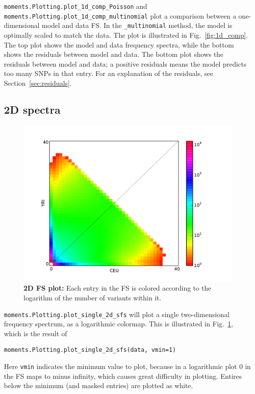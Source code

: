 \documentclass[12pt]{article}
\makeatletter
\newcommand{\py}[1]{\lstinline[breaklines=true,language=Python, showstringspaces=False]@#1@}
\makeatother
\begin{document}
\py{moments.Plotting.plot_1d_comp_Poisson} and \py{moments.Plotting.plot_1d_comp_multinomial} plot a comparison between a one-dimensional model and data FS.
In the \py{_multinomial} method, the model is optimally scaled to match the data.
The plot is illustrated in Fig.~\ref{fig:1d_comp}.
The top plot shows the model and data frequency spectra, while the bottom shows the residuals between model and data.
The bottom plot shows the residuals between model and data; a positive residuals means the model predicts too many SNPs in that entry.
For an explanation of the residuals, see Section~\ref{sec:residuals}.

\subsection{2D spectra}

\begin{figure}
\centering
\includegraphics[scale=0.3]{2d_single}
\caption{\textbf{2D FS plot:} Each entry in the FS is colored according to the logarithm of the number of variants within it.\label{fig:2d_single}}
\end{figure}

\py{moments.Plotting.plot_single_2d_sfs} will plot a single two-dimensional frequency spectrum, as a logarithmic colormap.
This is illustrated in Fig.~\ref{fig:2d_single}, which is the result of
\begin{lstlisting}
moments.Plotting.plot_single_2d_sfs(data, vmin=1)
\end{lstlisting}
Here \py{vmin} indicates the minimum value to plot, because in a logarithmic plot 0 in the FS maps to minus infinity, which causes great difficulty in plotting.
Entires below the minimum (and masked entries) are plotted as white.
\end{document}
